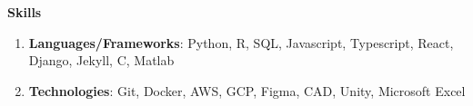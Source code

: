 \documentclass[letterpaper,11pt]{article}
\newlength{\outerbordwidth}
\newcommand{\resheading}[1]{\vspace{0pt} %
  \parbox{\textwidth}{\setlength{\FrameSep}{\outerbordwidth}
    \begin{shaded}
\setlength{\fboxsep}{0pt}\framebox[\textwidth][l]{\setlength{\fboxsep}{3.5pt}\fcolorbox{shadecolorB}{shadecolorB}{\textbf{\sffamily{\mbox{~}\makebox[7.262in][l]{\large #1} \vphantom{p\^{E}}}}}} %
    \end{shaded}
  }\vspace{-7pt} %
}
\begin{document}
\vspace{-10pt}

\begin{mybox}
	\hspace{-8pt} \textbf{Skills}
\end{mybox}

\vspace{-5pt}
	\begin{enumerate}[leftmargin=10pt]
		\itemsep0em
		\item[] \textbf{Languages/Frameworks}: Python, R, SQL, Javascript, Typescript, React, Django, Jekyll, C, Matlab
		\item[] \textbf{Technologies}: Git, Docker, AWS, GCP, Figma, CAD, Unity, Microsoft Excel
		
	\end{enumerate}
\end{document}
